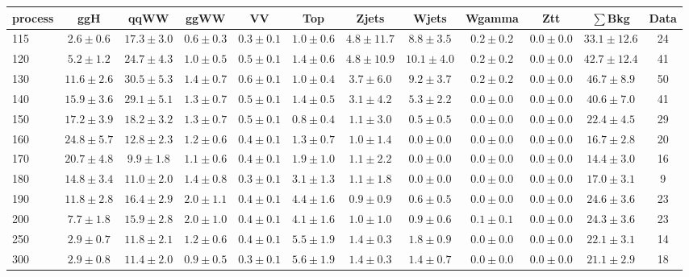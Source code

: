 \begin{table}[!hb]
{\footnotesize
 \begin{center}
 \begin{tabular}{l c c c c c c c c c c c }
 \hline
 process & ggH & qqWW & ggWW & VV & Top & Zjets & Wjets & Wgamma & Ztt & $\sum$Bkg & Data \\
 \hline
115 & $2.6\pm0.6$ & $17.3\pm3.0$ & $0.6\pm0.3$ & $0.3\pm0.1$ & $1.0\pm0.6$ & $4.8\pm11.7$ & $8.8\pm3.5$ & $0.2\pm0.2$ & $0.0\pm0.0$ & $33.1\pm12.6$ & 24 \\
120 & $5.2\pm1.2$ & $24.7\pm4.3$ & $1.0\pm0.5$ & $0.5\pm0.1$ & $1.4\pm0.6$ & $4.8\pm10.9$ & $10.1\pm4.0$ & $0.2\pm0.2$ & $0.0\pm0.0$ & $42.7\pm12.4$ & 41 \\
130 & $11.6\pm2.6$ & $30.5\pm5.3$ & $1.4\pm0.7$ & $0.6\pm0.1$ & $1.0\pm0.4$ & $3.7\pm6.0$ & $9.2\pm3.7$ & $0.2\pm0.2$ & $0.0\pm0.0$ & $46.7\pm8.9$ & 50 \\
140 & $15.9\pm3.6$ & $29.1\pm5.1$ & $1.3\pm0.7$ & $0.5\pm0.1$ & $1.4\pm0.5$ & $3.1\pm4.2$ & $5.3\pm2.2$ & $0.0\pm0.0$ & $0.0\pm0.0$ & $40.6\pm7.0$ & 41 \\
150 & $17.2\pm3.9$ & $18.2\pm3.2$ & $1.3\pm0.7$ & $0.5\pm0.1$ & $0.8\pm0.4$ & $1.1\pm3.0$ & $0.5\pm0.5$ & $0.0\pm0.0$ & $0.0\pm0.0$ & $22.4\pm4.5$ & 29 \\
160 & $24.8\pm5.7$ & $12.8\pm2.3$ & $1.2\pm0.6$ & $0.4\pm0.1$ & $1.3\pm0.7$ & $1.0\pm1.4$ & $0.0\pm0.0$ & $0.0\pm0.0$ & $0.0\pm0.0$ & $16.7\pm2.8$ & 20 \\
170 & $20.7\pm4.8$ & $9.9\pm1.8$ & $1.1\pm0.6$ & $0.4\pm0.1$ & $1.9\pm1.0$ & $1.1\pm2.2$ & $0.0\pm0.0$ & $0.0\pm0.0$ & $0.0\pm0.0$ & $14.4\pm3.0$ & 16 \\
180 & $14.8\pm3.4$ & $11.0\pm2.0$ & $1.4\pm0.8$ & $0.3\pm0.1$ & $3.1\pm1.3$ & $1.1\pm1.8$ & $0.0\pm0.0$ & $0.0\pm0.0$ & $0.0\pm0.0$ & $17.0\pm3.1$ & 9 \\
190 & $11.8\pm2.8$ & $16.4\pm2.9$ & $2.0\pm1.1$ & $0.4\pm0.1$ & $4.4\pm1.6$ & $0.9\pm0.9$ & $0.6\pm0.5$ & $0.0\pm0.0$ & $0.0\pm0.0$ & $24.6\pm3.6$ & 23 \\
200 & $7.7\pm1.8$ & $15.9\pm2.8$ & $2.0\pm1.0$ & $0.4\pm0.1$ & $4.1\pm1.6$ & $1.0\pm1.0$ & $0.9\pm0.6$ & $0.1\pm0.1$ & $0.0\pm0.0$ & $24.3\pm3.6$ & 23 \\
250 & $2.9\pm0.7$ & $11.8\pm2.1$ & $1.2\pm0.6$ & $0.4\pm0.1$ & $5.5\pm1.9$ & $1.4\pm0.3$ & $1.8\pm0.9$ & $0.0\pm0.0$ & $0.0\pm0.0$ & $22.1\pm3.1$ & 14 \\
300 & $2.9\pm0.8$ & $11.4\pm2.0$ & $0.9\pm0.5$ & $0.3\pm0.1$ & $5.6\pm1.9$ & $1.4\pm0.3$ & $1.4\pm0.7$ & $0.0\pm0.0$ & $0.0\pm0.0$ & $21.1\pm2.9$ & 18 \\

\end{tabular}
\end{center}}
\end{table}
